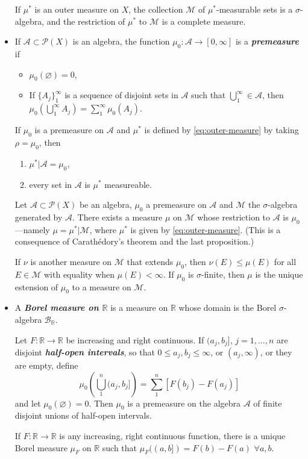\documentclass{article}
\theoremstyle{definition}
\numberwithin{equation}{section}
\newcommand{\R}{\mathbb{R}}
\begin{document}
\begin{itemize}
		\begin{thm}[Carathèodory]
			If $\mu^*$ is an outer measure on $X$, the collection $\mathcal{M}$ of $\mu^*$-measurable sets is a $\sigma$-algebra, and the restriction of $\mu^*$ to $\mathcal{M}$ is a complete measure.
		\end{thm}
		\item If $\mathcal{A}\subset\mathcal{P}(X)$ is an algebra, the function $\mu_0:\mathcal{A}\to[0,\infty]$ is a \textbf{\textit{premeasure}} if
		\begin{itemize}
			\item $\mu_0(\varnothing)=0$,
			\item If $\{A_j\}_1^\infty$ is a sequence of disjoint sets in $\mathcal{A}$ such that $\bigcup_1^\infty\in\mathcal{A}$, then $\mu_0\left(\bigcup_{1}^\infty A_j\right)=\sum_1^\infty\mu_0(A_j)$.
		\end{itemize}
		\begin{prop}
			If $\mu_0$ is a premeasure on $\mathcal{A}$ and $\mu^*$ is defined by \cref{eq:outer-measure} by taking $\rho=\mu_0$, then
			\begin{enumerate}
				\item $\mu^*|\mathcal{A}=\mu_0$,
				\item every set in $\mathcal{A}$ is $\mu^*$ measureable.
			\end{enumerate}
		\end{prop}
		\begin{thm}\label{thm:1.8}
			Let $\mathcal{A}\subset\mathcal{P}(X)$ be an algebra, $\mu_0$ a premeasure on $\mathcal{A}$ and $\mathcal{M}$ the $\sigma$-algebra generated by $\mathcal{A}$. There exists a measure $\mu$ on $\mathcal{M}$ whose restriction to $\mathcal{A}$ is $\mu_0$---namely $\mu=\mu^*|\mathcal{M}$, where $\mu^*$ is given by \cref{eq:outer-measure}. (This is a consequence of Carathédory's theorem and the last proposition.)
			
			If $\nu$ is another measure on $\mathcal{M}$ that extends $\mu_0$, then $\nu(E)\leq\mu(E)$ for all $E\in\mathcal{M}$ with equality when $\mu(E)<\infty$. If $\mu_0$ is $\sigma$-finite, then $\mu$ is the unique estension of $\mu_0$ to a measure on $\mathcal{M}$.
		\end{thm}
		\item A \textbf{\textit{Borel measure on $\R$}} is a measure on $\R$ whose domain is the Borel $\sigma$-algebra $\mathcal{B}_\R$.
		\begin{prop}
			Let $F:\R\to\R$ be increasing and right continuous. If $(a_j,b_j]$, $j=1,\ldots,n$ are disjoint \textbf{\textit{half-open intervals}}, so that $0\leq a_j,b_j\leq\infty$, or $(a_j,\infty)$, or they are empty, define
			\[\mu_0\left(\bigcup_{1}^n(a_j,b_j]\right)=\sum_1^n[F(b_j)-F(a_j)]\]
			and let $\mu_0(\varnothing)=0$. Then $\mu_0$ is a premeasure on the algebra $\mathcal{A}$ of finite disjoint unions of half-open intervals.
		\end{prop}
		\begin{thm}
			If $F:\R\to\R$ is any increasing, right continuous function, there is a unique Borel measure $\mu_F$ on $\R$ such that $\mu_F((a,b])=F(b)-F(a)$ $\forall a,b$.
			

\end{thm}
\end{itemize}
\end{document}
